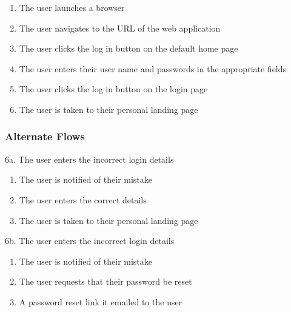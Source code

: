 \documentclass[12pt,onecolumn]{article}
\begin{document}
		\begin{enumerate}
			\item The user launches a browser

			\item The user navigates to the URL of the web application

			\item The user clicks the log in button on the default home page

			\item The user enters their user name and passwords in the appropriate fields

			\item The user clicks the log in button on the login page

			\item The user is taken to their personal landing page

		\end{enumerate}

		\subsubsection{Alternate Flows}

		6a. The user enters the incorrect login details

		\begin{enumerate}
			\item The user is notified of their mistake

			\item The user enters the correct details

			\item The user is taken to their personal landing page
		\end{enumerate}

		\hspace{-0.8cm} 6b. The user enters the incorrect login details

		\begin{enumerate}
			\item The user is notified of their mistake

			\item The user requests that their password be reset

			\item A password reset link it emailed to the user
		\end{enumerate}
\end{document}
